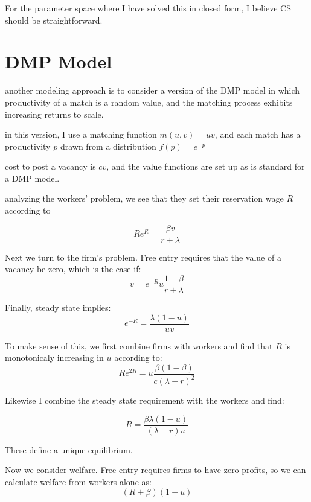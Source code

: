 \documentclass[WP]{AEA}
\begin{document}
For the parameter space where I have solved this in closed form, I believe CS should be straightforward.  

\section{DMP Model}
another modeling approach is to consider a version of the DMP model in which productivity of a match is a random value, and the matching process exhibits increasing returns to scale.

in this version, I use a matching function $m(u,v)=uv$, and each match has a productivity $p$ drawn from a distribution $f(p)=e^{-p}$

cost to post a vacancy is  $cv$, and the value functions are set up as is standard for a DMP model.

analyzing the workers' problem, we see that they set their reservation wage $R$ according to

\begin{equation} \label{DMP:workers}
R e^R = \frac{\beta v}{r+ \lambda}
\end{equation}


Next we turn to the firm's problem. Free entry requires that the value of a vacancy be zero, which is the case if:
\begin{equation} \label{DMP:firms}
v = e^{-R} u \frac{1-\beta}{r+ \lambda}
\end{equation}

Finally, steady state implies:
\begin{equation} \label{DMP:steadystate}
e^{-R}=\frac{\lambda(1-u)}{uv}
\end{equation}

To make sense of this, we first combine firms with workers and find that $R$ is monotonicaly increasing in $u$ according to:
\begin{equation} \label{DMP:firms_workers}
Re^{2R}=u\frac{\beta (1-\beta)}{c(\lambda+r)^2}
\end{equation}

Likewise I combine the steady state requirement with the workers and find:

\begin{equation} \label{DMP:stst_workers}
R=\frac{\beta \lambda (1-u)}{(\lambda+r)u}
\end{equation}

These define a unique equilibrium.

Now we consider welfare. Free entry requires firms to have zero profits, so we can calculate welfare from workers alone as:
\begin{equation} \label{DMP:welfare_workers}
	(R+ \beta)(1-u)
\end{equation}
\end{document}
